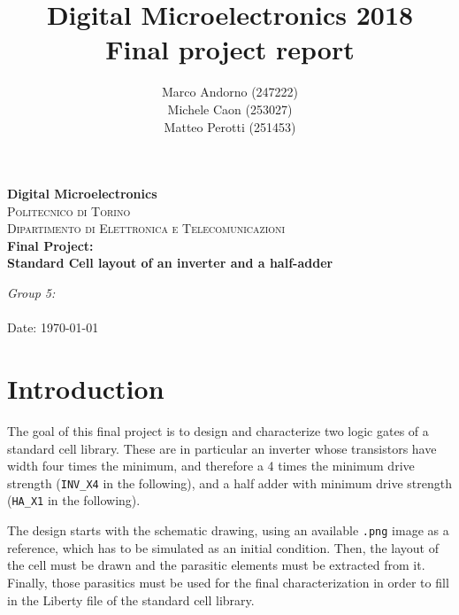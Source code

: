\documentclass[a4paper]{article}
\title{Digital Microelectronics 2018 \\ Final project report}
\author{Marco Andorno (247222)\\ Michele Caon (253027) \\ Matteo Perotti (251453)}
\newcommand{\inv}{\texttt{INV\_X4}\xspace}
\newcommand{\ha}{\texttt{HA\_X1}\xspace}
\begin{document}
\begin{center}

\thispagestyle{empty}

\textbf{\Large Digital Microelectronics}\\[1.0cm]
\textsc{\Large Politecnico di Torino}\\[0.5cm]
\textsc{\large Dipartimento di Elettronica e Telecomunicazioni}\\[1cm]

\huge \textbf{Final Project: \\}
\huge \textbf{Standard Cell layout of an inverter and a half-adder}

\end{center}

\vfill
\large
\begin{flushleft}
\makeatletter
\emph{Group 5:}\\
\@author \\
\vspace{1cm}
\normalsize Date: \today
\makeatother
\end{flushleft}


\newpage

\pagestyle{fancy}
\lhead{}
\chead{}
\rhead{\leftmark}
\lfoot{\thepage}
\cfoot{}
\rfoot{}
\renewcommand{\headrulewidth}{0.3pt}
\renewcommand{\footrulewidth}{0.3pt}


\section{Introduction}
The goal of this final project is to design and characterize two logic gates of a standard cell library. These are in particular an inverter whose transistors have width four times the minimum, and therefore a 4 times the minimum drive strength (\inv in the following), and a half adder with minimum drive strength (\ha in the following).

The design starts with the schematic drawing, using an available \texttt{.png} image as a reference, which has to be simulated as an initial condition. Then, the layout of the cell must be drawn and the parasitic elements must be extracted from it. Finally, those parasitics must be used for the final characterization in order to fill in the Liberty file of the standard cell library.
\end{document}
